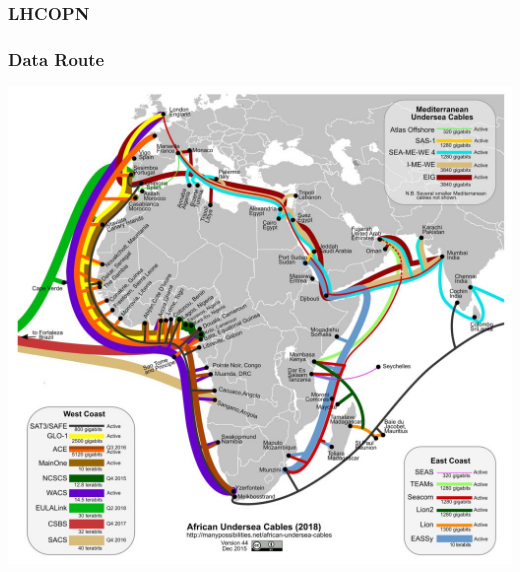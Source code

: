 \documentclass{beamer}
\begin{document}
\begin{frame}
  \frametitle{LHCOPN}
\end{frame}

\begin{frame}
    \frametitle{Data Route}
  \includegraphics[scale=1]{african_undersea_cables.jpg}
\end{frame}
\end{document}
